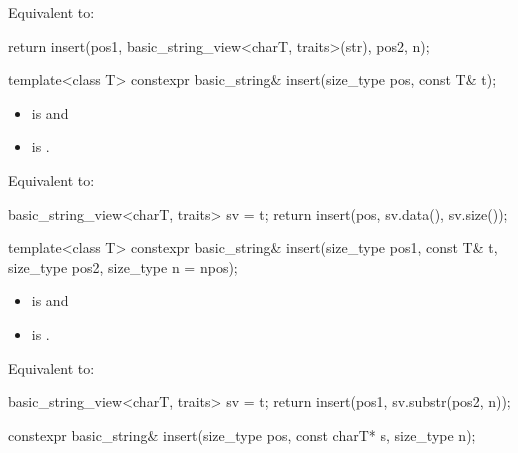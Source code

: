 \begin{itemdescr}
\pnum
\effects
Equivalent to:
\begin{codeblock}
return insert(pos1, basic_string_view<charT, traits>(str), pos2, n);
\end{codeblock}
\end{itemdescr}

%
\begin{itemdecl}
template<class T>
  constexpr basic_string& insert(size_type pos, const T& t);
\end{itemdecl}

\begin{itemdescr}
\pnum
\constraints
\begin{itemize}
\item
{} is
 and
\item
{} is
.
\end{itemize}

\pnum
\effects
Equivalent to:
\begin{codeblock}
basic_string_view<charT, traits> sv = t;
return insert(pos, sv.data(), sv.size());
\end{codeblock}
\end{itemdescr}

%
\begin{itemdecl}
template<class T>
  constexpr basic_string& insert(size_type pos1, const T& t,
                                 size_type pos2, size_type n = npos);
\end{itemdecl}

\begin{itemdescr}
\pnum
\constraints
\begin{itemize}
\item
{} is
 and
\item
{} is
.
\end{itemize}

\pnum
\effects
Equivalent to:
\begin{codeblock}
basic_string_view<charT, traits> sv = t;
return insert(pos1, sv.substr(pos2, n));
\end{codeblock}
\end{itemdescr}

%
\begin{itemdecl}
constexpr basic_string& insert(size_type pos, const charT* s, size_type n);
\end{itemdecl}

